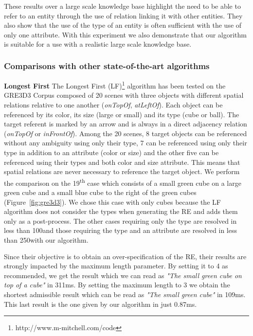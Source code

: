 \documentclass[a4paper,11pt,twoside]{StyleThese}
\begin{document}
These results over a large scale knowledge base highlight the need to be able to refer to an entity through the use of relation linking it with other entities. They also show that the use of the type of an entity is often sufficient with the use of only one attribute. With this experiment we also demonstrate that our algorithm is suitable for a use with a realistic large scale knowledge base.

\subsubsection{Comparisons with other state-of-the-art algorithms}
\label{subsubsec:REGcomparisons}

\textbf{Longest First} The Longest First (LF)\footnote{http://www.m-mitchell.com/code} algorithm \cite{viethen2013graphs} has been tested on the GRE3D3 Corpus composed of 20 scenes with three objects with different spatial relations relative to one another (\textit{onTopOf}, \textit{atLeftOf}). Each object can be referenced by its color, its size (large or small) and its type (cube or ball). The target referent is marked by an arrow and is always in a direct adjacency relation (\textit{onTopOf} or \textit{inFrontOf}).
Among the 20 scenes, 8 target objects can be referenced without any ambiguity using only their type, 7 can be referenced using only their type in addition to an attribute (color or size) and the other five can be referenced using their types and both color and size attribute. This means that spatial relations are never necessary to reference the target object. 
We perform the comparison on the 19\textsuperscript{th} case which consists of a small green cube on a large green cube and a small blue cube to the right of the green cubes (Figure~\ref{fig:gre3d3}). We chose this case with only cubes because the LF algorithm does not consider the types when generating the RE and adds them only as a post-process. The other cases requiring only the type are resolved in less than 100\us and those requiring the type and an attribute are resolved in less than 250\us with our algorithm.

Since their objective is to obtain an over-specification of the RE, their results are strongly impacted by the maximum length parameter. By setting it to 4 as recommended, we get the result which we can read as \textit{"The small green cube on top of a cube"} in 311ms. By setting the maximum length to 3 we obtain the shortest admissible result which can be read as \textit{"The small green cube"} in 109ms. This last result is the one given by our algorithm in just 0.87ms.
\end{document}
